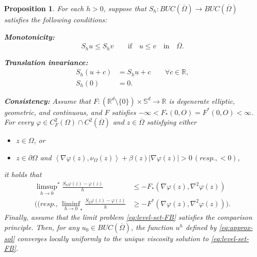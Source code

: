 \documentclass[11pt]{article}
\numberwithin{equation}{section}
\newtheorem{proposition}[theorem]{Proposition}
\newcommand{\R}{\mathbb{R}}
\def\le{\leqslant}
\def\ge{\geqslant}
\begin{document}
\begin{proposition}\label{prop:BS}
    For each $h>0$, suppose that $S_h:BUC(\overline{\Omega})\to BUC(\overline{\Omega})$ satisfies the following conditions:\newline

    \noindent
    \textbf{Monotonicity:}\newline
    \begin{equation*}
        S_h u \le S_h v\qquad\mbox{if}\quad u \le v\quad\text{in}\quad\overline{\Omega}.
    \end{equation*}

    \noindent
    \textbf{Translation invariance:}\newline
    \begin{equation*}
        \begin{aligned}
            S_h(u + c) &= S_h u + c\qquad \forall c\in\R,\\
            S_h (0) &= 0.
        \end{aligned}
    \end{equation*}

    \noindent
    \textbf{Consistency:}
    Assume that $F:(\R^d\setminus\{0\})\times\mathbb S^{d}\to\R$ is degenerate elliptic, geometric, and continuous, and $F$ satisfies $-\infty<F_*(0,O) = F^*(0,O) < \infty$.
    For every $\varphi\in C^2_F(\Omega)\cap C^2(\overline{\Omega})$ and $z\in\overline{\Omega}$ satisfying either
    \begin{itemize}
        \item $z\in\Omega$, or
        \item $z\in\partial\Omega$ and $\left<\nabla\varphi(z),\nu_\Omega(z)\right> + \beta(z)|\nabla\varphi(z)| > 0\, (resp., < 0)$,
    \end{itemize}
    it holds that
    \begin{equation}
        \label{eq:consistency}
        \begin{aligned}
        {\limsup_{h\to 0}}^*\frac{S_h\varphi(z) - \varphi(z)}{h}  &\le - F_*(\nabla\varphi(z), \nabla^2\varphi(z))\\
        ((resp.,\, {\liminf_{h\to 0}}_*\frac{S_h\varphi(z) - \varphi(z)}{h}  &\ge - F^*(\nabla\varphi(z), \nabla^2\varphi(z))).
        \end{aligned}
    \end{equation}
    Finally, assume that the limit problem \eqref{eq:level-set-FB} satisfies the comparison principle.
    Then, for any $u_0\in BUC(\overline{\Omega})$, the function $u^h$ defined by \eqref{eq:approx-sol} converges locally uniformly to the unique viscosity solution to \eqref{eq:level-set-FB}.

\end{proposition}
\end{document}
